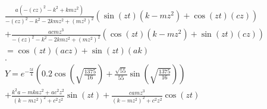 \documentclass[12pt]{article}
\begin{document}
\begin{enumerate}
        \begin{equation}
            \begin{aligned}
                &\frac{a(-(cz)^2-k^2+kmz^2)}{-(cz)^2-k^2-2kmz^2+(mz^2)^2} (\sin(zt)(k-mz^2)+\cos(zt)(cz)) \\
                &+ \frac{acmz^3}{-(cz)^2-k^2-2kmz^2+(mz^2)^2} (\cos(zt)(k-mz^2)+\sin(zt)(cz)) \\
                &= \cos(zt)(acz) + \sin(zt)(ak) \\
                &. \\
                &Y = e^{-\frac{5t}{4}}\left(0.2\cos(\sqrt{\frac{1375}{16}})+\frac{\sqrt{55}}{55}\sin(\sqrt{\frac{1375}{16}})\right) \\
                &+\frac{k^2a-mkaz^2+ac^2z^2}{(k-mz^2)^2+c^2z^2}\sin(zt)+\frac{camz^3}{(k-mz^2)^2+c^2z^2}\cos(zt)
            \end{aligned}
        \end{equation}
        
        
    \end{enumerate}
\end{document}
